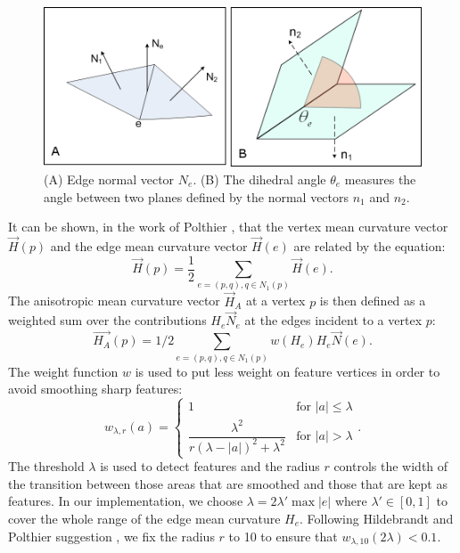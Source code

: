 \documentclass[11pt]{article}
\begin{document}
\begin{figure}[htbp]
	\centering
	\includegraphics[width=\textwidth]{fig34.png}
	\caption{(A) Edge normal vector $N_e$. (B) The dihedral angle $\theta_e$ measures the angle between two planes defined by the normal vectors $n_1$ and $n_2$.}
	\label{fig:curvature}
\end{figure}

It can be shown, in the work of Polthier \cite{PolthierHabilitation}, that the vertex mean curvature vector $\vec{H}(p)$ and the edge mean curvature vector $\vec{H}(e)$ are related by the equation:
\begin{equation}
\vec{H}(p) = \frac{1}{2}\sum\limits_{e = (p, q), q \in N_1(p)}\vec{H}(e).
\end{equation}
The anisotropic mean curvature vector $\vec{H}_A$ at a vertex $p$ is then defined as a weighted sum over the contributions $H_e\vec{N}_e$ at the edges incident to a vertex $p$:
\begin{equation}
\vec{H_A}(p) = 1/2\sum\limits_{e = (p, q), q \in N_1(p)}{w(H_e)H_e \vec{N}(e)}.
\label{eq:aniso}
\end{equation}
The weight function $w$ is used to put less weight on feature vertices in order to avoid smoothing sharp features:
\begin{equation}
w_{\lambda, r}(a) = 
\begin{cases}
1 & \text{for } |a| \leq \lambda \\
\dfrac{\lambda^2}{r(\lambda - |a|)^2+\lambda^2} & \text{for } |a| > \lambda
\end{cases}.
\end{equation}
The threshold $\lambda$ is used to detect features and the radius $r$ controls the width of the transition between those areas that are smoothed and those that are kept as features. In our implementation, we choose $\lambda = 2 \lambda' \max |e| $ where $\lambda' \in \left[ 0, 1 \right] $ to cover the whole range of the edge mean curvature $H_e$. Following Hildebrandt and Polthier suggestion \cite{Hildebrandt04anisotropicfiltering}, we fix the radius $r$ to 10 to ensure that $w_{\lambda, 10}(2\lambda) < 0.1$.
\end{document}
